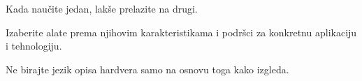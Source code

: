 \begin{frame}[label=07-s020]
\par\vspace{4mm}
Kada naučite jedan, lakše prelazite na drugi.
\par\vspace{4mm}
Izaberite alate prema njihovim karakteristikama i podršci za konkretnu aplikaciju i tehnologiju.
\par\vspace{4mm}
Ne birajte jezik opisa hardvera samo na osnovu toga kako izgleda.
\end{frame}

